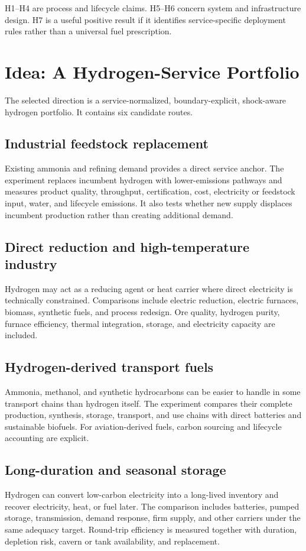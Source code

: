 \documentclass[conference]{IEEEtran}
\begin{document}
H1--H4 are process and lifecycle claims. H5--H6 concern system and infrastructure design. H7 is a useful positive result if it identifies service-specific deployment rules rather than a universal fuel prescription.

\section{Idea: A Hydrogen-Service Portfolio}
\label{sec:idea}
The selected direction is a service-normalized, boundary-explicit, shock-aware hydrogen portfolio. It contains six candidate routes.

\subsection{Industrial feedstock replacement}
Existing ammonia and refining demand provides a direct service anchor. The experiment replaces incumbent hydrogen with lower-emissions pathways and measures product quality, throughput, certification, cost, electricity or feedstock input, water, and lifecycle emissions. It also tests whether new supply displaces incumbent production rather than creating additional demand.

\subsection{Direct reduction and high-temperature industry}
Hydrogen may act as a reducing agent or heat carrier where direct electricity is technically constrained. Comparisons include electric reduction, electric furnaces, biomass, synthetic fuels, and process redesign. Ore quality, hydrogen purity, furnace efficiency, thermal integration, storage, and electricity capacity are included.

\subsection{Hydrogen-derived transport fuels}
Ammonia, methanol, and synthetic hydrocarbons can be easier to handle in some transport chains than hydrogen itself. The experiment compares their complete production, synthesis, storage, transport, and use chains with direct batteries and sustainable biofuels. For aviation-derived fuels, carbon sourcing and lifecycle accounting are explicit.

\subsection{Long-duration and seasonal storage}
Hydrogen can convert low-carbon electricity into a long-lived inventory and recover electricity, heat, or fuel later. The comparison includes batteries, pumped storage, transmission, demand response, firm supply, and other carriers under the same adequacy target. Round-trip efficiency is measured together with duration, depletion risk, cavern or tank availability, and replacement.
\end{document}
